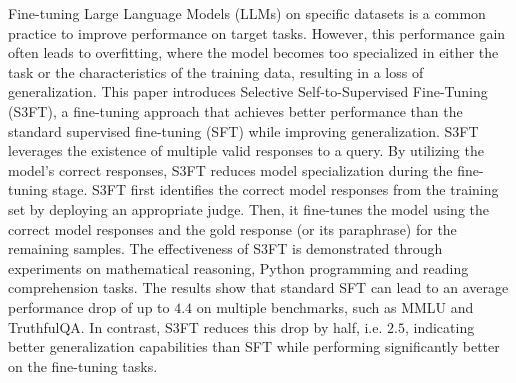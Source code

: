 Fine-tuning Large Language Models (LLMs) on specific datasets is a common practice to improve performance on target tasks. However, this performance gain often leads to overfitting, where the model becomes too specialized in either the task or the characteristics of the training data, resulting in a loss of generalization. This paper introduces Selective Self-to-Supervised Fine-Tuning (S3FT), a fine-tuning approach that achieves better performance than the standard supervised fine-tuning (SFT) while improving generalization.
S3FT leverages the existence of multiple valid responses to a query.
By utilizing the model's correct responses, S3FT reduces model specialization during the fine-tuning stage. S3FT first identifies the correct model responses from the training set by deploying an appropriate judge. Then, it fine-tunes the model using the correct model responses and the gold response (or its paraphrase) for the remaining samples.
The effectiveness of S3FT is demonstrated through experiments on mathematical reasoning, Python programming and reading comprehension tasks. The results show that standard SFT can lead to an average performance drop of up to $4.4$ on multiple benchmarks, such as MMLU and TruthfulQA. In contrast, S3FT reduces this drop by half, i.e. $2.5$, indicating better generalization capabilities than SFT while performing significantly better on the fine-tuning tasks.